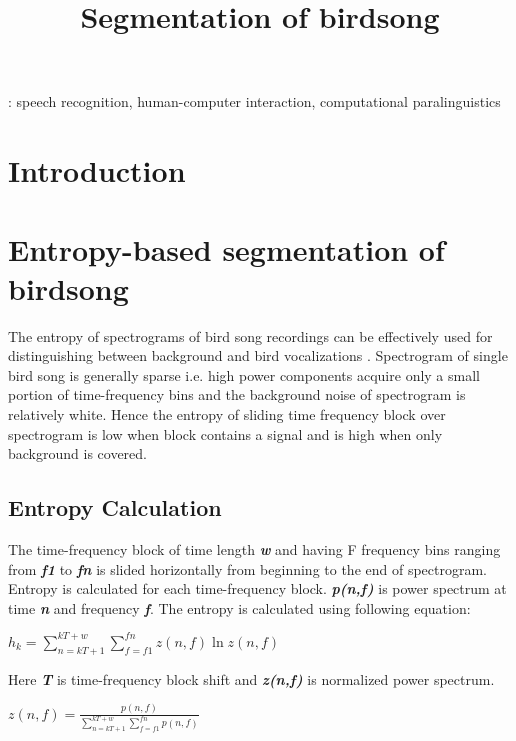 \documentclass[a4paper]{article}
\title{Segmentation of birdsong}
\begin{document}
  \maketitle
  \begin{abstract}
  \end{abstract}
  : speech recognition, human-computer interaction, computational paralinguistics



  \section{Introduction}

\section{Entropy-based segmentation of birdsong}
The entropy of spectrograms of bird song recordings can be effectively used for distinguishing between background and bird vocalizations \cite{6625329}. Spectrogram of single bird song is generally sparse i.e. high power components acquire only a small portion of time-frequency bins and the background noise of spectrogram is relatively white. Hence  the entropy of sliding time frequency block over spectrogram is low when block contains a signal and is high when only background is covered. 
\subsection{Entropy Calculation}
The time-frequency block of time length \textbf{\textit{w}} and having F frequency bins ranging from \textbf{\textit{f1}} to  \textbf{\textit{fn}} is slided horizontally from beginning to the end of spectrogram. Entropy is calculated for each time-frequency block. \textbf{\textit{p(n,f)}} is power spectrum at time \textbf{\textit{n}} and frequency  \textbf{\textit{f}}.  The entropy is calculated using following equation:

\hspace{1cm}
  $h_{k}=\sum_{n=kT+1}^{kT+w}\sum_{f=f1}^{fn}z(n,f) \ln z(n,f)$

 \hspace{1cm}
 
Here \textbf{\textit{T}} is time-frequency block shift and \textbf{\textit{z(n,f)}} is normalized power spectrum.


\hspace{1cm}
$z(n,f)=\frac {p(n,f)}
{\sum_{n=kT+1}^{kT+w}\sum_{f=f1}^{fn} p(n,f)}$
\end{document}
